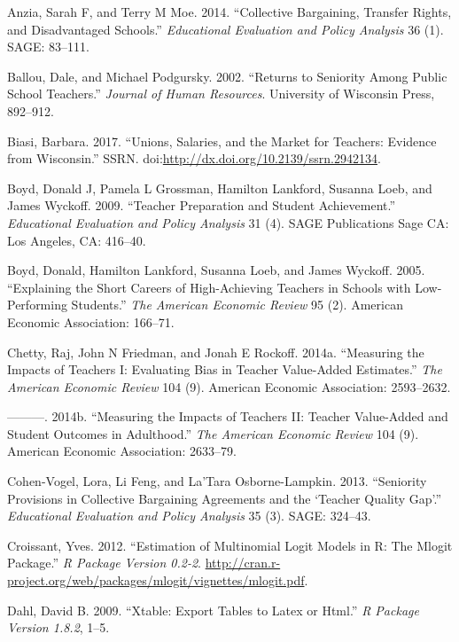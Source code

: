 \documentclass[12pt,]{article}
\begin{document}
\hypertarget{refs}{}
\hypertarget{ref-anzia}{}
Anzia, Sarah F, and Terry M Moe. 2014. ``Collective Bargaining, Transfer
Rights, and Disadvantaged Schools.'' \emph{Educational Evaluation and
Policy Analysis} 36 (1). SAGE: 83--111.

\hypertarget{ref-ballou}{}
Ballou, Dale, and Michael Podgursky. 2002. ``Returns to Seniority Among
Public School Teachers.'' \emph{Journal of Human Resources}. University
of Wisconsin Press, 892--912.

\hypertarget{ref-biasi}{}
Biasi, Barbara. 2017. ``Unions, Salaries, and the Market for Teachers:
Evidence from Wisconsin.'' SSRN.
doi:\href{https://doi.org/http://dx.doi.org/10.2139/ssrn.2942134}{http://dx.doi.org/10.2139/ssrn.2942134}.

\hypertarget{ref-boyd2009}{}
Boyd, Donald J, Pamela L Grossman, Hamilton Lankford, Susanna Loeb, and
James Wyckoff. 2009. ``Teacher Preparation and Student Achievement.''
\emph{Educational Evaluation and Policy Analysis} 31 (4). SAGE
Publications Sage CA: Los Angeles, CA: 416--40.

\hypertarget{ref-boyd2005}{}
Boyd, Donald, Hamilton Lankford, Susanna Loeb, and James Wyckoff. 2005.
``Explaining the Short Careers of High-Achieving Teachers in Schools
with Low-Performing Students.'' \emph{The American Economic Review} 95
(2). American Economic Association: 166--71.

\hypertarget{ref-chettyI}{}
Chetty, Raj, John N Friedman, and Jonah E Rockoff. 2014a. ``Measuring
the Impacts of Teachers I: Evaluating Bias in Teacher Value-Added
Estimates.'' \emph{The American Economic Review} 104 (9). American
Economic Association: 2593--2632.

\hypertarget{ref-chettyII}{}
---------. 2014b. ``Measuring the Impacts of Teachers II: Teacher
Value-Added and Student Outcomes in Adulthood.'' \emph{The American
Economic Review} 104 (9). American Economic Association: 2633--79.

\hypertarget{ref-cohenvogel}{}
Cohen-Vogel, Lora, Li Feng, and La'Tara Osborne-Lampkin. 2013.
``Seniority Provisions in Collective Bargaining Agreements and the
`Teacher Quality Gap'.'' \emph{Educational Evaluation and Policy
Analysis} 35 (3). SAGE: 324--43.

\hypertarget{ref-croissant}{}
Croissant, Yves. 2012. ``Estimation of Multinomial Logit Models in R:
The Mlogit Package.'' \emph{R Package Version 0.2-2}.
\url{http://cran.r-project.org/web/packages/mlogit/vignettes/mlogit.pdf}.

\hypertarget{ref-dahl}{}
Dahl, David B. 2009. ``Xtable: Export Tables to Latex or Html.'' \emph{R
Package Version 1.8.2}, 1--5.
\end{document}
